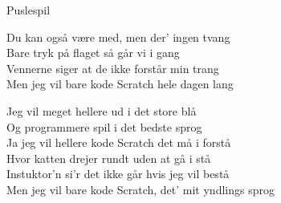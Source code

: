 \begin{song}{Puslespil}
    \begin{SBSection*}
        Du kan også være med, men der' ingen tvang \\ 
        Bare tryk på flaget så går vi i gang \\ 
        Vennerne siger at de ikke forstår min trang \\ 
        Men jeg vil bare kode Scratch hele dagen lang  \medskip
        
        Jeg vil meget hellere ud i det store blå  \\
        Og programmere spil i det bedste sprog \\
        Ja jeg vil hellere kode Scratch det må i forstå \\
        Hvor katten drejer rundt uden at gå i stå \\
        Instuktor'n si'r det ikke går hvis jeg vil bestå \\
        Men jeg vil bare kode Scratch, det' mit yndlings sprog \\
    \end{SBSection*}
  \end{song}